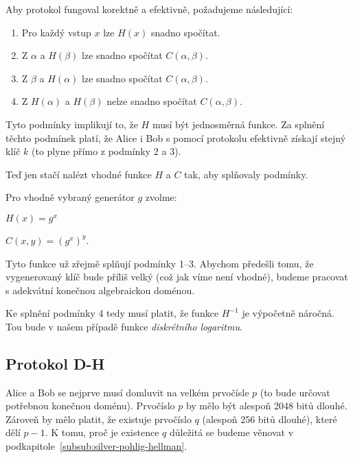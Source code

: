 \documentclass[
  program=infoi,
  biblatex,
  figures=false,
  glossaries,
  index
]{kidiplom}
\begin{document}
    Aby protokol fungoval korektně a efektivně, požadujeme následující:

    \begin{enumerate}
        \item
            Pro každý vstup $x$ lze $H(x)$ snadno spočítat.
        \item
            Z $\alpha$ a $H(\beta)$ lze snadno spočítat $C(\alpha,\beta)$.
        \item
            Z $\beta$ a $H(\alpha)$ lze snadno spočítat $C(\alpha,\beta)$.
        \item
            Z $H(\alpha)$ a $H(\beta)$ nelze snadno spočítat $C(\alpha,\beta)$.
    \end{enumerate}

    Tyto podmínky implikují to, že $H$ musí být jednosměrná funkce.
    Za splnění těchto podmínek platí, že Alice i Bob s pomocí protokolu efektivně získají
    stejný klíč $k$ (to plyne přímo z podmínky 2 a 3).

    \medskip

    Teď jen stačí nalézt vhodné funkce $H$ a $C$ tak, aby splňovaly podmínky.

    \medskip

    Pro vhodně vybraný generátor $g$ zvolme:

    \begin{center}
        $H(x) = g^x$

        $C(x, y) = (g^x)^y$.

        \medskip
    \end{center}

    Tyto funkce už zřejmě splňují podmínky 1--3. Abychom předešli tomu, že vygenerovaný klíč bude příliš velký
    (což jak víme není vhodné), budeme pracovat s adekvátní konečnou algebraickou doménou.

    Ke splnění podmínky 4 tedy musí platit, že funkce $H^{-1}$ je výpočetně náročná.
    Tou bude v našem případě funkce \emph{diskrétního logaritmu}.


    \subsection{Protokol D-H}

        Alice a Bob se nejprve musí domluvit na velkém prvočísle $p$ (to bude určovat potřebnou konečnou doménu).
        Prvočíslo $p$ by mělo být alespoň 2048 bitů dlouhé.
        Zároveň by mělo platit, že existuje prvočíslo $q$ (alespoň 256 bitů dlouhé), které dělí $p-1$.
        K tomu, proč je existence $q$ důležitá se budeme věnovat v podkapitole~\ref{subsub:silver-pohlig-hellman}.
\end{document}
